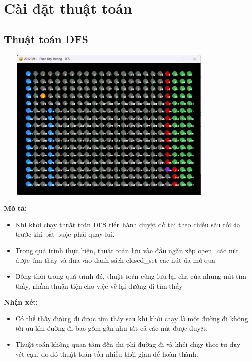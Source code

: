 \documentclass{article}
\begin{document}
\section{Cài đặt thuật toán}
\subsection{Thuật toán DFS}
    \centerline{\includegraphics[width=4.5in, height=3in]{image/dfs_stimulation.png}}
    \textbf{Mô tả: }
    \begin{itemize}
        \item Khi khởi chạy thuật toán DFS tiến hành duyệt đồ thị theo chiều sâu tối đa trước khi bắt buộc phải quay lui.
        \item Trong quá trình thực hiện, thuật toán lưu vào đầu ngăn xếp open\_các nút được tìm thấy và đưa vào danh sách closed\_set các nút đã mở qua
        \item Đồng thời trong quá trình đó, thuật toán cũng lưu lại cha của những nút tìm thấy, nhầm thuận tiện cho việc vẽ lại đường đi tìm thấy
    \end{itemize}
    \textbf{Nhận xét: }
    \begin{itemize}
        \item Có thể thấy đường đi được tìm thấy sau khi khởi chạy là một đường đi không tối ưu khi đường đi bao gồm gần như tất cả các nút được duyệt.
        \item Thuật toán không quan tâm đến chi phỉ đường đi và khởi chạy theo tư duy vét cạn, do đó thuật toán tốn nhiều thời gian để hoàn thành.
    \end{itemize}
    
    \vspace{2\baselineskip}
\end{document}
